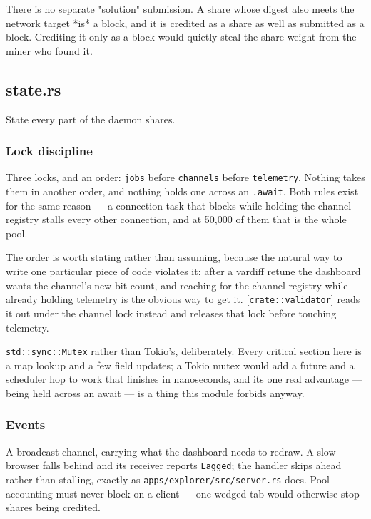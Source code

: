 \documentclass[11pt,a4paper]{article}
\begin{document}
There is no separate "solution" submission. A share whose digest also meets
the network target *is* a block, and it is credited as a share as well as
submitted as a block. Crediting it only as a block would quietly steal the
share weight from the miner who found it.

\subsection{state.rs}
State every part of the daemon shares.

\subsubsection{Lock discipline}

Three locks, and an order: \texttt{jobs} before \texttt{channels} before \texttt{telemetry}.
Nothing takes them in another order, and nothing holds one across an
\texttt{.await}. Both rules exist for the same reason — a connection task that
blocks while holding the channel registry stalls every other connection,
and at 50,000 of them that is the whole pool.

The order is worth stating rather than assuming, because the natural way to
write one particular piece of code violates it: after a vardiff retune the
dashboard wants the channel's new bit count, and reaching for the channel
registry while already holding telemetry is the obvious way to get it.
[\texttt{crate::validator}] reads it out under the channel lock instead and
releases that lock before touching telemetry.

\texttt{std::sync::Mutex} rather than Tokio's, deliberately. Every critical section
here is a map lookup and a few field updates; a Tokio mutex would add a
future and a scheduler hop to work that finishes in nanoseconds, and its one
real advantage — being held across an await — is a thing this module
forbids anyway.

\subsubsection{Events}

A broadcast channel, carrying what the dashboard needs to redraw. A slow
browser falls behind and its receiver reports \texttt{Lagged}; the handler skips
ahead rather than stalling, exactly as \texttt{apps/explorer/src/server.rs} does. Pool
accounting must never block on a client — one wedged tab would otherwise
stop shares being credited.
\end{document}
